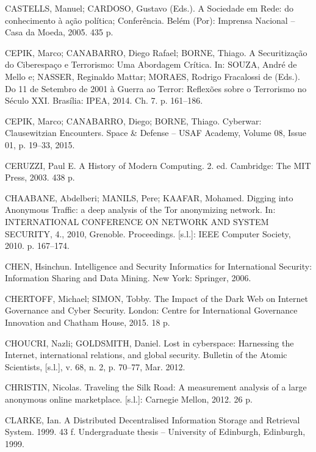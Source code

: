 \begin{list}{}{\setlength{\leftmargin}{0pt}\setlength{\itemsep}{6pt}\setlength{\parsep}{0pt}}
\item CASTELLS, Manuel; CARDOSO, Gustavo (Eds.). A Sociedade em Rede: do conhecimento \`a a\c{c}\~ao pol\'itica; Confer\^encia. Bel\'em (Por): Imprensa Nacional -- Casa da Moeda, 2005. 435 p.

\item CEPIK, Marco; CANABARRO, Diego Rafael; BORNE, Thiago. A Securitiza\c{c}\~ao do Ciberespa\c{c}o e Terrorismo: Uma Abordagem Cr\'itica. In: SOUZA, Andr\'e de Mello e; NASSER, Reginaldo Mattar; MORAES, Rodrigo Fracalossi de (Eds.). Do 11 de Setembro de 2001 \`a Guerra ao Terror: Reflex\~oes sobre o Terrorismo no S\'eculo XXI. Bras\'ilia: IPEA, 2014. Ch. 7. p. 161--186.

\item CEPIK, Marco; CANABARRO, Diego; BORNE, Thiago. Cyberwar: Clausewitzian Encounters. Space \& Defense -- USAF Academy, Volume 08, Issue 01, p. 19--33, 2015.

\item CERUZZI, Paul E. A History of Modern Computing. 2. ed. Cambridge: The MIT Press, 2003. 438 p.

\item CHAABANE, Abdelberi; MANILS, Pere; KAAFAR, Mohamed. Digging into Anonymous Traffic: a deep analysis of the Tor anonymizing network. In: INTERNATIONAL CONFERENCE ON NETWORK AND SYSTEM SECURITY, 4., 2010, Grenoble. Proceedings. [s.l.]: IEEE Computer Society, 2010. p. 167--174.

\item CHEN, Hsinchun. Intelligence and Security Informatics for International Security: Information Sharing and Data Mining. New York: Springer, 2006.

\item CHERTOFF, Michael; SIMON, Tobby. The Impact of the Dark Web on Internet Governance and Cyber Security. London: Centre for International Governance Innovation and Chatham House, 2015. 18 p.

\item CHOUCRI, Nazli; GOLDSMITH, Daniel. Lost in cyberspace: Harnessing the Internet, international relations, and global security. Bulletin of the Atomic Scientists, [s.l.], v. 68, n. 2, p. 70--77, Mar. 2012.

\item CHRISTIN, Nicolas. Traveling the Silk Road: A measurement analysis of a large anonymous online marketplace. [s.l.]: Carnegie Mellon, 2012. 26 p.

\item CLARKE, Ian. A Distributed Decentralised Information Storage and Retrieval System. 1999. 43 f. Undergraduate thesis -- University of Edinburgh, Edinburgh, 1999.


\end{list}

